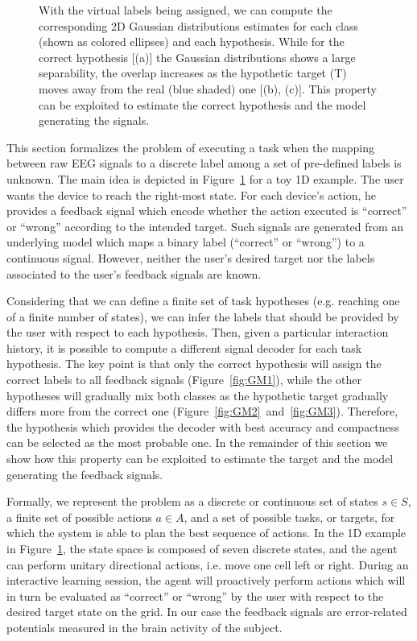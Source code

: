 \documentclass[letterpaper]{article}
\begin{document}
\begin{figure}[!ht]
{With the virtual labels being assigned, we can compute the corresponding 2D Gaussian distributions estimates for each class (shown as colored ellipses) and each hypothesis. While for the correct hypothesis [(a)] the Gaussian distributions shows a large separability, the overlap increases as the hypothetic target (T) moves away from the real (blue shaded) one [(b), (c)]. This property can be exploited to estimate the correct hypothesis and the model generating the signals.}
\label{fig:GM}
\end{figure}
%
This section formalizes the problem of executing a task when the mapping between raw EEG signals to a discrete label among a set of pre-defined labels is unknown. The main idea is depicted in Figure~\ref{fig:GM} for a toy 1D example. The user wants the device to reach the right-most state. For each device's action, he provides a feedback signal which encode whether the action executed is ``correct'' or ``wrong'' according to the intended target. Such signals are generated from an underlying model which maps a binary label (``correct'' or ``wrong'') to a continuous signal. However, neither the user's desired target nor the labels associated to the user's feedback signals are known.

Considering that we can define a finite set of task hypotheses (e.g. reaching one of a finite number of states), we can infer the labels that should be provided by the user with respect to each hypothesis. Then, given a particular interaction history, it is possible to compute a different signal decoder for each task hypothesis. The key point is that only the correct hypothesis will assign the correct labels to all feedback signals (Figure~\ref{fig:GM1}), while the other hypotheses will gradually mix both classes as the hypothetic target gradually differs more from the correct one (Figure~\ref{fig:GM2}~and~\ref{fig:GM3}). Therefore, the hypothesis which provides the decoder with best accuracy and compactness can be selected as the most probable one. In the remainder of this section we show how this property can be exploited to estimate the target and the model generating the feedback signals.

Formally, we represent the problem as a discrete or continuous set of states $s \in S$,  a finite set of possible actions $a \in A$, and a set of possible tasks, or targets, for which the system is able to plan the best sequence of actions. In the 1D example in Figure~\ref{fig:GM}, the state space is composed of seven discrete states, and the agent can perform unitary directional actions, i.e. move one cell left or right. During an interactive learning session, the agent will proactively perform actions which will in turn be evaluated as ``correct'' or ``wrong'' by the user with respect to the desired target state on the grid. In our case the feedback signals are error-related potentials measured in the brain activity of the subject.
\end{document}
